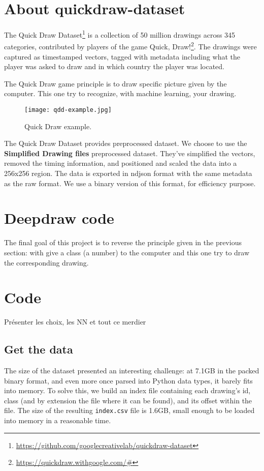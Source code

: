 \documentclass[
  10pt, 
  a4paper,
  oneside, 
  headinclude, 
  footinclude, 
  BCOR5mm, 
]{scrartcl}
\begin{document}
\section{About quickdraw-dataset}

The Quick Draw Dataset\footnote{\url{https://github.com/googlecreativelab/quickdraw-dataset}} is a collection of 50 million drawings across 345 categories, contributed by players of the game Quick, Draw!\footnote{\url{https://quickdraw.withgoogle.com/\#}}. The drawings were captured as timestamped vectors, tagged with metadata including what the player was asked to draw and in which country the player was located.

The Quick Draw game principle is to draw specific picture given by the computer. This one try to recognize, with machine learning, your drawing.

\begin{figure}[h]
	\center
	\texttt{[image: qdd-example.jpg]}
	\caption{Quick Draw example.}
	\label{promo-asylamba}
\end{figure}

The Quick Draw Dataset provides preprocessed dataset. We choose to use the \textbf{Simplified Drawing files} preprocessed dataset. They've simplified the vectors, removed the timing information, and positioned and scaled the data into a 256x256 region. The data is exported in ndjson format with the same metadata as the raw format. We use a binary version of this format, for efficiency purpose.


\section{Deepdraw code}

The final goal of this project is to reverse the principle given in the previous section: with give a class (a number) to the computer and this one try to draw the corresponding drawing.


\section{Code}

Présenter les choix, les NN et tout ce merdier

\subsection{Get the data}

The size of the dataset presented an interesting challenge: at 7.1GB in the
packed binary format, and even more once parsed into Python data types, it
barely fits into memory. To solve this, we build an index file containing each
drawing's id, class (and by extension the file where it can be found), and its
offset within the file. The size of the resulting \texttt{index.csv} file is
1.6GB, small enough to be loaded into memory in a reasonable time.
\end{document}
